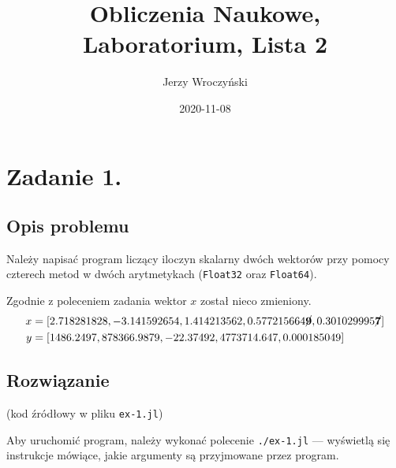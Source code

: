 \documentclass[10pt]{article}
\title{Obliczenia Naukowe,\\Laboratorium, Lista 2}
\author{Jerzy Wroczyński}
\date{2020-11-08}
\begin{document}
\maketitle

\section{Zadanie 1.}

\subsection{Opis problemu}
Należy napisać program liczący iloczyn skalarny dwóch wektorów przy pomocy czterech metod w dwóch arytmetykach (\texttt{Float32} oraz \texttt{Float64}).

Zgodnie z poleceniem zadania wektor $x$ został nieco zmieniony.
$$
\begin{aligned}
    x &= [2.718281828, -3.141592654, 1.414213562, 0.577215664\boldmath\cancel{9}, 0.301029995\boldmath\cancel{7}]\\
    y &= [1486.2497, 878366.9879, -22.37492, 4773714.647, 0.000185049]
\end{aligned}
$$

\subsection{Rozwiązanie}

(kod źródłowy w pliku \texttt{ex-1.jl})

Aby uruchomić program, należy wykonać polecenie \texttt{./ex-1.jl} — wyświetlą się instrukcje mówiące, jakie argumenty są przyjmowane przez program.
\end{document}
